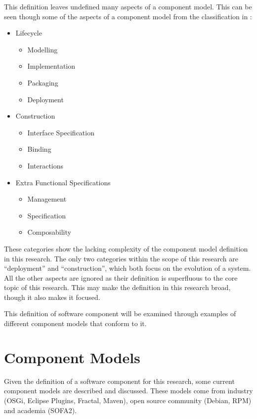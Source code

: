 This definition leaves undefined many aspects of a component model. 
This can be seen though some of the aspects of a component model from the classification in \citep{Crnkovic2011}:
\begin{itemize}
  \item Lifecycle 
  		\begin{itemize}
	  		\item Modelling
	  		\item Implementation
	  		\item Packaging
	  		\item Deployment
		\end{itemize}
	\item Construction
		\begin{itemize}
	  		\item Interface Specification
	  		\item Binding
	  		\item Interactions 
		\end{itemize}
	\item Extra Functional Specifications
		\begin{itemize}
	  		\item Management
	  		\item Specification
	  		\item Composability
		\end{itemize}	
\end{itemize}  
These categories show the lacking complexity of the component model definition in this research.
The only two categories within the scope of this research are ``deployment'' and ``construction'', which both focus on the evolution of a system.
All the other aspects are ignored as their definition is superfluous to the core topic of this research.
This may make the definition in this research broad, though it also makes it focused.

This definition of software component will be examined through examples of different component models that conform to it.

\section{Component Models}
\label{background.models}
Given the definition of a software component for this research, some current component models are described and discussed.
These models come from industry (OSGi, Eclipse Plugins, Fractal, Maven), open source community (Debian, RPM) and academia (SOFA2).

